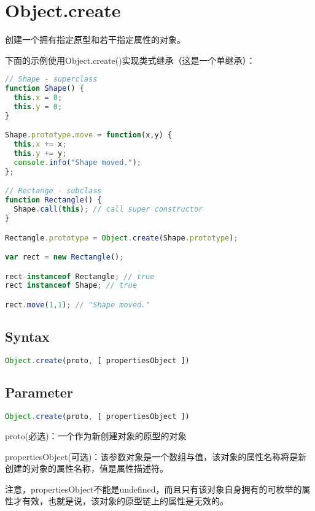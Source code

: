\section{Object.create}

创建一个拥有指定原型和若干指定属性的对象。

下面的示例使用Object.create()实现类式继承（这是一个单继承）：

\begin{lstlisting}[language=JavaScript]
// Shape - superclass
function Shape() {
  this.x = 0;
  this.y = 0;
}

Shape.prototype.move = function(x,y) {
  this.x += x;
  this.y += y;
  console.info("Shape moved.");
};

// Rectange - subclass
function Rectangle() {
  Shape.call(this); // call super constructor
}

Rectangle.prototype = Object.create(Shape.prototype);

var rect = new Rectangle();

rect instanceof Rectangle; // true
rect instanceof Shape; // true

rect.move(1,1); // "Shape moved."
\end{lstlisting}


\subsection{Syntax}


\begin{lstlisting}[language=JavaScript]
Object.create(proto, [ propertiesObject ])
\end{lstlisting}


\subsection{Parameter}


\begin{lstlisting}[language=JavaScript]
Object.create(proto, [ propertiesObject ])
\end{lstlisting}


\begin{compactitem}
\item proto(必选)：一个作为新创建对象的原型的对象
\item propertiesObject(可选)：该参数对象是一个数组与值，该对象的属性名称将是新创建的对象的属性名称，值是属性描述符。
\end{compactitem}

注意，propertiesObject不能是undefined，而且只有该对象自身拥有的可枚举的属性才有效，也就是说，该对象的原型链上的属性是无效的。


